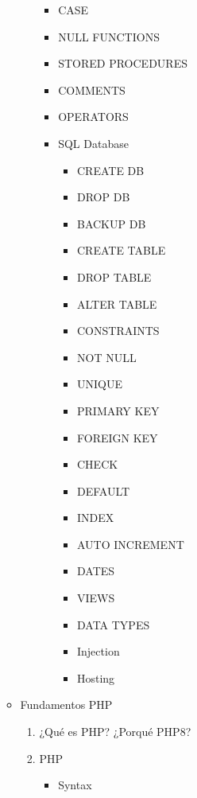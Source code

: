 \documentclass[12pt, letterpaper]{article}
\begin{document}
\begin{enumerate}
\begin{itemize}
\begin{enumerate}
\begin{itemize}
                \item CASE
                \item NULL FUNCTIONS
                \item STORED PROCEDURES
                \item COMMENTS
                \item OPERATORS 
                \item SQL Database
                \begin{itemize}
                    \item CREATE DB
                    \item DROP DB
                    \item BACKUP DB
                    \item CREATE TABLE
                    \item DROP TABLE
                    \item ALTER TABLE
                    \item CONSTRAINTS
                    \item NOT NULL
                    \item UNIQUE
                    \item PRIMARY KEY
                    \item FOREIGN KEY
                    \item CHECK
                    \item DEFAULT
                    \item INDEX
                    \item AUTO INCREMENT
                    \item DATES
                    \item VIEWS
                    \item DATA TYPES
                    \item Injection
                    \item Hosting
                \end{itemize}
            \end{itemize}
        \end{enumerate}
        \item Fundamentos PHP
        \begin{enumerate}
            \item ¿Qué es PHP? ¿Porqué PHP8?
            \item PHP
            \begin{itemize}
                \item Syntax 

\end{itemize}
\end{enumerate}
\end{itemize}
\end{enumerate}
\end{document}
